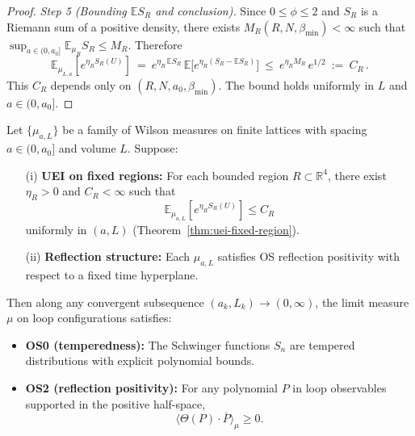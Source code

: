 \documentclass[11pt]{amsart}
\begin{document}
\begin{proof}
\emph{Step 5 (Bounding $\mathbb{E}S_R$ and conclusion).} Since $0\le\phi\le 2$ and $S_R$ is a Riemann sum of a positive density, there exists $M_R(R,N,\beta_{\min})<\infty$ such that $\sup_{a\in(0,a_0]}\mathbb{E}_{\mu_R}S_R\le M_R$. Therefore
\[
  \mathbb{E}_{\mu_{L,a}}\!\left[e^{\eta_R S_R(U)}\right]
  \ =\ e^{\eta_R\,\mathbb{E}S_R}\,\mathbb{E}\big[e^{\eta_R(S_R-\mathbb{E}S_R)}\big]
  \ \le\ e^{\eta_R M_R}\,e^{1/2}
  \ :=\ C_R\,.
\]
This $C_R$ depends only on $(R,N,a_0,\beta_{\min})$. The bound holds uniformly in $L$ and $a\in(0,a_0]$.
\end{proof}

\begin{theorem}\label{thm:os0-os2-closure}
Let $\{\mu_{a,L}\}$ be a family of Wilson measures on finite lattices with spacing $a \in (0,a_0]$ and volume $L$. Suppose:
\begin{itemize}
  \item[(i)] \textbf{UEI on fixed regions:} For each bounded region $R \subset \mathbb{R}^4$, there exist $\eta_R > 0$ and $C_R < \infty$ such that
  \[
    \mathbb{E}_{\mu_{a,L}}[e^{\eta_R S_R(U)}] \le C_R
  \]
  uniformly in $(a,L)$ (Theorem~\ref{thm:uei-fixed-region}).
  \item[(ii)] \textbf{Reflection structure:} Each $\mu_{a,L}$ satisfies OS reflection positivity with respect to a fixed time hyperplane.
\end{itemize}
Then along any convergent subsequence $(a_k, L_k) \to (0, \infty)$, the limit measure $\mu$ on loop configurations satisfies:
\begin{itemize}
  \item \textbf{OS0 (temperedness):} The Schwinger functions $S_n$ are tempered distributions with explicit polynomial bounds.
  \item \textbf{OS2 (reflection positivity):} For any polynomial $P$ in loop observables supported in the positive half-space,
  \[
    \langle \Theta(P) \cdot \overline{P} \rangle_\mu \ge 0.
  \]
\end{itemize}
\end{theorem}
\end{document}

